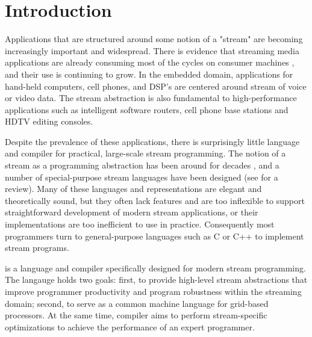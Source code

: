 \section{Introduction}

Applications that are structured around some notion of a "stream"
are becoming increasingly important and widespread.  There is
evidence that streaming media applications are already consuming
most of the cycles on consumer machines \cite{Rix98}, and their
use is continuing to grow.  In the embedded domain, applications
for hand-held computers, cell phones, and DSP's are centered
around stream of voice or video data.  The stream abstraction is
also fundamental to high-performance applications such as
intelligent software routers, cell phone base stations and HDTV
editing consoles.

Despite the prevalence of these applications, there is
surprisingly little language and compiler for practical,
large-scale stream programming.  The notion of a stream as a
programming abstraction has been around for decades \cite{SICP},
and a number of special-purpose stream languages have been
designed (see \cite{survey97} for a review). Many of these
languages and representations are elegant and theoretically sound,
but they often lack features and are too inflexible to support
straightforward development of modern stream applications, or
their implementations are too inefficient to use in practice.
Consequently most programmers turn to general-purpose languages
such as C or C++ to implement stream programs.

\begin{comment}
There are two reasons that general-purpose languages are
inappropriate for stream programming.  Firstly, they are a
mismatch for the application domain.  That is they do not provide
a natural or intuitive representation of streams thereby having a
negative effect on readability, robustness, and programmer
productivity.  Furthermore, general-purpose languages do not
communicate well the inherent parallelism of stream computations.
 Secondly, general-purpose languages are a mismatch for the
emerging class of grid-based architectures
\cite{smartmemories,rawshort,trips}.
\end{comment}

{\StreamIt} is a language and compiler specifically designed for
modern stream programming.  The {\StreamIt} langauge holds two
goals: first, to provide high-level stream abstractions that
improve programmer productivity and program robustness within the
streaming domain; second, to serve as a common machine language
for grid-based processors.  At the same time, {\StreamIt} compiler
aims to perform stream-specific optimizations to achieve the
performance of an expert programmer.

